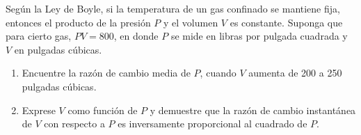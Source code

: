 \item Según la Ley de Boyle, si la temperatura de un gas confinado se mantiene fija, entonces el producto de la presión $P$ y el volumen $V$ es constante. Suponga que para cierto gas, $PV = 800$, en donde $P$ se mide en libras por pulgada cuadrada y $V$ en pulgadas cúbicas.
    \begin{enumerate}
        \item Encuentre la razón de cambio media de $P$, cuando $V$ aumenta de 200 a 250 pulgadas cúbicas.
        \item Exprese $V$ como función de $P$ y demuestre que la razón de cambio instantánea de $V$ con respecto a $P$ es inversamente proporcional al cuadrado de $P$.
    \end{enumerate}
